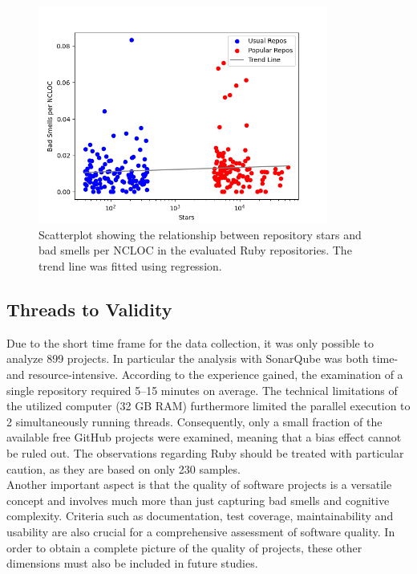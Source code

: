 \documentclass[a4paper, 12pt]{article}
\begin{document}
\begin{figure}[h!]
  \centering
  \includegraphics[width=0.85\textwidth]{./media/ruby-smells-scatterplot.png}
  \caption{Scatterplot showing the relationship between repository stars and bad smells per NCLOC in the evaluated Ruby repositories. The trend line was fitted using regression.}
  \label{fig:scatter-smells-ruby}
\end{figure}

\subsection*{Threads to Validity}

Due to the short time frame for the data collection, it was only possible to analyze 899 projects. In particular the analysis with SonarQube was both time- and resource-intensive. According to the experience gained, the examination of a single repository required 5--15 minutes on average. The technical limitations of the utilized computer (32 GB RAM) furthermore limited the parallel execution to 2 simultaneously running threads.  Consequently, only a small fraction of the available free GitHub projects were examined, meaning that a bias effect cannot be ruled out. The observations regarding Ruby should be treated with particular caution, as they are based on only 230 samples.\\

Another important aspect is that the quality of software projects is a versatile concept and involves much more than just capturing bad smells and cognitive complexity. Criteria such as documentation, test coverage, maintainability and usability are also crucial for a comprehensive assessment of software quality. In order to obtain a complete picture of the quality of projects, these other dimensions must also be included in future studies.\\
\end{document}
